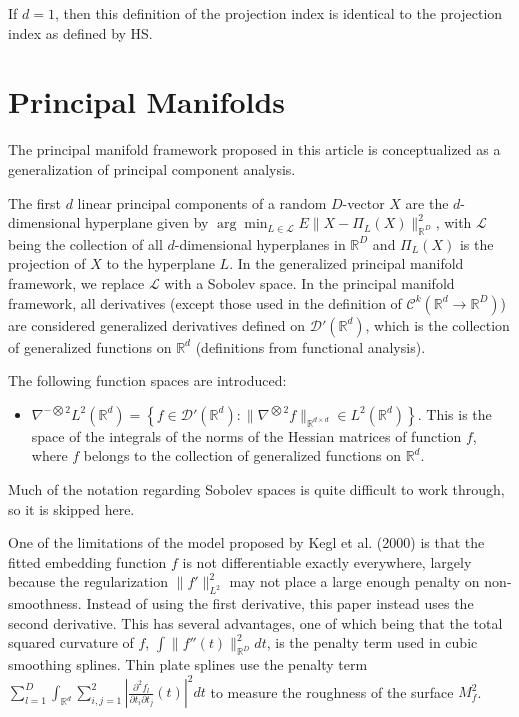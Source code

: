 If $d=1$, then this definition of the projection index is identical to the projection index as defined by HS.

\section*{Principal Manifolds}

The principal manifold framework proposed in this article is conceptualized as a generalization of principal component analysis.

The first $d$ linear principal components of a random $D$-vector $X$ are the $d$-dimensional hyperplane given by $\arg \min_{L \in \mathcal{L}}E\|X - \Pi_L(X)\|_{\mathbb{R}^{D}}^2$, with $\mathcal{L}$ being the collection of all $d$-dimensional hyperplanes in $\mathbb{R}^{D}$ and $\Pi_L(X)$ is the projection of $X$ to the hyperplane $L$. In the generalized principal manifold framework, we replace $\mathcal{L}$ with a Sobolev space. In the principal manifold framework, all derivatives (except those used in the definition of $\mathcal{C}^{k}(\mathbb{R}^{d} \to \mathbb{R}^{D})$) are considered generalized derivatives defined on $\mathcal{D}'(\mathbb{R}^{d})$, which is the collection of generalized functions on $\mathbb{R}^{d}$ (definitions from functional analysis).

The following function spaces are introduced:
\begin{itemize}
  \label{item:sobolev_spaces}

  \item $\nabla^{-\bigotimes 2}L^2(\mathbb{R}^{d}) = \left\{f \in \mathcal{D'}(\mathbb{R}^{d}): \|\nabla^{\bigotimes 2}f\|_{\mathbb{R}^{d \times d}} \in L^2(\mathbb{R}^{d})\right\}$. This is the space of the integrals of the norms of the Hessian matrices of function $f$, where $f$ belongs to the collection of generalized functions on $\mathbb{R}^{d}$.
    
  \end{itemize}
Much of the notation regarding Sobolev spaces is quite difficult to work through, so it is skipped here.

One of the limitations of the model proposed by Kegl et al. (2000) is that the fitted embedding function $f$ is not differentiable exactly everywhere, largely because the regularization $\|f'\|_{L^2}^2$ may not place a large enough penalty on non-smoothness. Instead of using the first derivative, this paper instead uses the second derivative. This has several advantages, one of which being that the total squared curvature of $f$, $\int \|f''(t)\|_{\mathbb{R}^{D}}^2 dt$, is the penalty term used in cubic smoothing splines. Thin plate splines use the penalty term $\sum_{l=1}^{D}\int_{\mathbb{R}^{d}}\sum_{i, j=1}^{2}\left|\frac{\partial^2f_l}{\partial t_i \partial t_j}(t)\right|^2dt$ to measure the roughness of the surface $M_f^2$.

